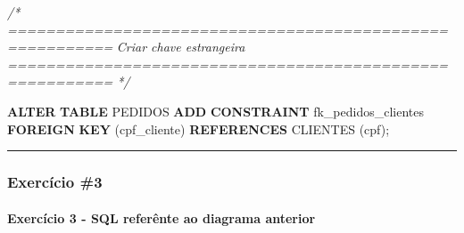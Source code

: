 \documentclass[
]{book}
\makeatletter
\newenvironment{Shaded}{\begin{snugshade}}{\end{snugshade}}
\newcommand{\CommentTok}[1]{\textcolor[rgb]{0.56,0.35,0.01}{\textit{#1}}}
\newcommand{\KeywordTok}[1]{\textcolor[rgb]{0.13,0.29,0.53}{\textbf{#1}}}
\newcommand{\NormalTok}[1]{#1}
\newcommand*\pandocbounded[1]{%
  \sbox\pandoc@box{#1}%
  \Gscale@div\@tempa{\textheight}{\dimexpr\ht\pandoc@box+\dp\pandoc@box\relax}%
  \Gscale@div\@tempb{\linewidth}{\wd\pandoc@box}%
  \ifdim\@tempb\p@<\@tempa\p@\let\@tempa\@tempb\fi%
  \ifdim\@tempa\p@<\p@\scalebox{\@tempa}{\usebox\pandoc@box}%
  \else\usebox{\pandoc@box}%
  \fi%
}
\makeatother
\begin{document}
\begin{Shaded}
\begin{Highlighting}[]
\CommentTok{/* =========================================================}
\CommentTok{   Criar chave estrangeira}
\CommentTok{   ========================================================= */}

\KeywordTok{ALTER} \KeywordTok{TABLE}\NormalTok{ PEDIDOS }\KeywordTok{ADD} \KeywordTok{CONSTRAINT}\NormalTok{ fk\_pedidos\_clientes  }\KeywordTok{FOREIGN} \KeywordTok{KEY}\NormalTok{ (cpf\_cliente) }\KeywordTok{REFERENCES}\NormalTok{ CLIENTES (cpf);}
\end{Highlighting}
\end{Shaded}

\begin{center}\rule{0.5\linewidth}{0.5pt}\end{center}

\subsubsection{Exercício \#3}\label{exercuxedcio-3-1}

\pandocbounded{}

\paragraph{Exercício 3 - SQL referênte ao diagrama anterior}\label{exercuxedcio-3---sql-referuxeante-ao-diagrama-anterior-1}
\end{document}
